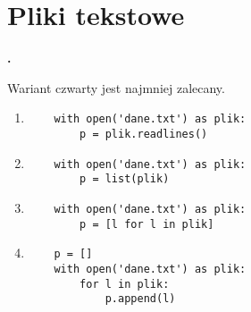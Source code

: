 \documentclass[a4paper]{article}
\begin{document}
\section{Pliki tekstowe}
\textbf{.}\addtocounter{zadanie}{1} Wariant czwarty jest najmniej zalecany.

\begin{enumerate}[label=\arabic*.]
    \lstset{numbers=none}
    \item \begin{lstlisting}
    with open('dane.txt') as plik:
        p = plik.readlines()
    \end{lstlisting}

    \item \begin{lstlisting}
    with open('dane.txt') as plik:
        p = list(plik)
    \end{lstlisting}

    \item \begin{lstlisting}
    with open('dane.txt') as plik:
        p = [l for l in plik]
    \end{lstlisting}

    \item \begin{lstlisting}
    p = []
    with open('dane.txt') as plik:
        for l in plik:
            p.append(l)
    \end{lstlisting}

\end{enumerate}
\end{document}
